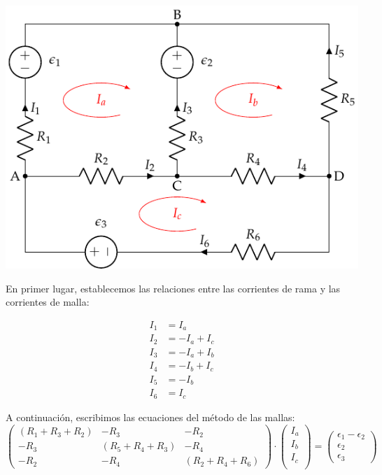 \documentclass[10pt]{article}
\begin{document}
  \includegraphics{figs/mallas1_corrientes.pdf}

En primer lugar, establecemos las relaciones entre las corrientes de rama y las corrientes de malla:

\begin{align*}
  I_1 &= I_a\\
  I_2 &= -I_a + I_c\\
  I_3 &= -I_a + I_b\\
  I_4 &= -I_b + I_c\\
  I_5 &= -I_b\\
  I_6 &= I_c
\end{align*}

A continuación, escribimos las ecuaciones del método de las mallas:
\begin{equation*}
  \begin{pmatrix}
    (R_1 + R_3 + R_2) &  - R_3 & - R_2 \\
    - R_3 & (R_5 + R_4 + R_3) & - R_4 \\
    - R_2 & - R_4 &  (R_2 + R_4 + R_6)
  \end{pmatrix} \cdot %
  \begin{pmatrix}
    I_a\\
    I_b\\
    I_c\\
  \end{pmatrix} = %
  \begin{pmatrix}
    \epsilon_1 - \epsilon_2\\
    \epsilon_2\\
    \epsilon_3
  \end{pmatrix}
\end{equation*}
\end{document}
